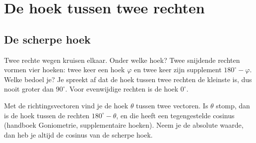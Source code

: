 \section{De hoek tussen twee rechten}

\subsection{De scherpe hoek}

Twee rechte wegen kruisen elkaar. Onder welke hoek? Twee snijdende rechten vormen vier hoeken: twee keer een hoek $\varphi$ en twee keer zijn supplement $180^\circ - \varphi$. Welke bedoel je? Je spreekt af dat de hoek tussen twee rechten de kleinste is, dus nooit groter dan $90^\circ$. Voor evenwijdige rechten is de hoek $0^\circ$.

Met de richtingsvectoren vind je de hoek $\theta$ tussen twee vectoren. Is $\theta$ stomp, dan is de hoek tussen de rechten $180^\circ - \theta$, en die heeft een tegengestelde cosinus (handboek Goniometrie, supplementaire hoeken). Neem je de absolute waarde, dan heb je altijd de cosinus van de scherpe hoek.


